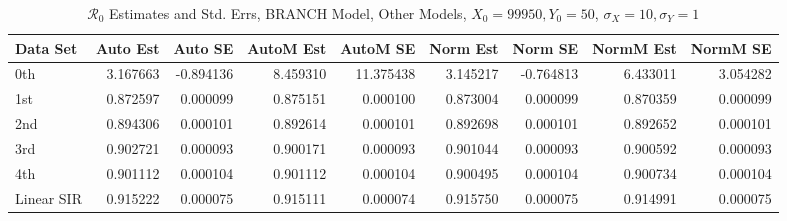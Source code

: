 \documentclass[12pt]{article}
\newcommand{\rr}{\ensuremath{\mathcal{R}_0}}
\begin{document}
\begin{table}[H]
	
	\caption{$\rr$ Estimates and Std. Errs, BRANCH Model,
		Other Models, $X_0 = 99950, Y_0 = 50$, 
		$\sigma_X = 10, \sigma_Y = 1$}
	\begin{footnotesize}
		\hskip -1cm
		\begin{tabular}{l|r|r|r|r|r|r|r|r}
			\hline
			Data Set & Auto Est & Auto SE & AutoM Est & AutoM SE & Norm Est & Norm SE & NormM Est & NormM SE\\
			\hline
			0th & 3.167663 & -0.894136 & 8.459310 & 11.375438 & 3.145217 & -0.764813 & 6.433011 & 3.054282\\
			\hline
			1st & 0.872597 & 0.000099 & 0.875151 & 0.000100 & 0.873004 & 0.000099 & 0.870359 & 0.000099\\
			\hline
			2nd & 0.894306 & 0.000101 & 0.892614 & 0.000101 & 0.892698 & 0.000101 & 0.892652 & 0.000101\\
			\hline
			3rd & 0.902721 & 0.000093 & 0.900171 & 0.000093 & 0.901044 & 0.000093 & 0.900592 & 0.000093\\
			\hline
			4th & 0.901112 & 0.000104 & 0.901112 & 0.000104 & 0.900495 & 0.000104 & 0.900734 & 0.000104\\
			\hline
			Linear SIR & 0.915222 & 0.000075 & 0.915111 & 0.000074 & 0.915750 & 0.000075 & 0.914991 & 0.000075\\
			\hline
		\end{tabular}
	\end{footnotesize}
\end{table}
\end{document}

